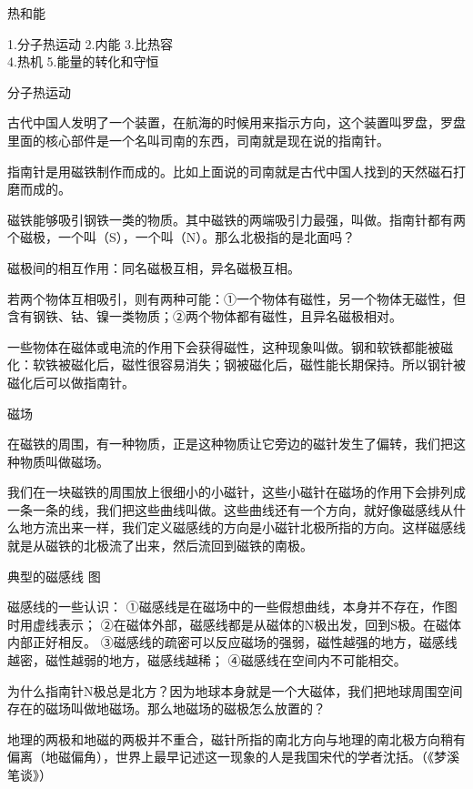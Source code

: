 \documentclass[12pt]{exam}
\newcommand{\keti}{热和能}
\newcommand{\zhongdian}{1.分子热运动 2.内能 3.比热容\\  4.热机 5.能量的转化和守恒}
\renewcommand{\section}[1]{{\large\sffamily  #1} \par}
\begin{document}
\vspace*{80pt}
\keti \par
\zhongdian \par
\section{分子热运动}
古代中国人发明了一个装置，在航海的时候用来指示方向，这个装置叫罗盘，罗盘里面的核心部件是一个名叫司南的东西，司南就是现在说的指南针。

指南针是用磁铁制作而成的。比如上面说的司南就是古代中国人找到的天然磁石打磨而成的。

磁铁能够吸引钢铁一类的物质。其中磁铁的两端吸引力最强，叫做\answerline*[磁极]。指南针都有两个磁极，一个叫\answerline*[南极]（S），一个叫\answerline*[北极]（N）。那么北极指的是北面吗？

磁极间的相互作用：同名磁极互相\answerline*[排斥]，异名磁极互相\answerline*[吸引]。

若两个物体互相吸引，则有两种可能：①一个物体有磁性，另一个物体无磁性，但含有钢铁、钴、镍一类物质；②两个物体都有磁性，且异名磁极相对。

一些物体在磁体或电流的作用下会获得磁性，这种现象叫做\answerline*[磁化]。钢和软铁都能被磁化：软铁被磁化后，磁性很容易消失；钢被磁化后，磁性能长期保持。所以钢针被磁化后可以做指南针。


\section{磁场}
在磁铁的周围，有一种物质，正是这种物质让它旁边的磁针发生了偏转，我们把这种物质叫做磁场。

我们在一块磁铁的周围放上很细小的小磁针，这些小磁针在磁场的作用下会排列成一条一条的线，我们把这些曲线叫做\answerline*[磁感线]。这些曲线还有一个方向，就好像磁感线从什么地方流出来一样，我们定义磁感线的方向是小磁针北极所指的方向。这样磁感线就是从磁铁的北极流了出来，然后流回到磁铁的南极。

典型的磁感线  图

磁感线的一些认识：
①磁感线是在磁场中的一些假想曲线，本身并不存在，作图时用虚线表示；
②在磁体外部，磁感线都是从磁体的N极出发，回到S极。在磁体内部正好相反。
③磁感线的疏密可以反应磁场的强弱，磁性越强的地方，磁感线越密，磁性越弱的地方，磁感线越稀；
④磁感线在空间内不可能相交。

为什么指南针N极总是北方？因为地球本身就是一个大磁体，我们把地球周围空间存在的磁场叫做地磁场。那么地磁场的磁极怎么放置的？

地理的两极和地磁的两极并不重合，磁针所指的南北方向与地理的南北极方向稍有偏离（地磁偏角），世界上最早记述这一现象的人是我国宋代的学者沈括。（《梦溪笔谈》）
\end{document}
